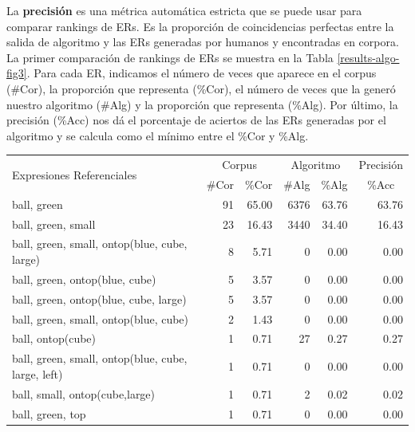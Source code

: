 La \textbf{precisi\'on}  es una m\'etrica autom\'atica estricta que se puede usar para comparar rankings de ERs. Es la proporci\'on de coincidencias perfectas entre la salida de algoritmo y las ERs generadas por humanos y encontradas en corpora. 
La primer comparaci\'on de rankings de ERs se muestra en la Tabla \ref{results-algo-fig3}. Para cada ER, indicamos el n\'umero de veces que aparece en el corpus (\#Cor), la proporci\'on que representa (\%Cor), el n\'umero de veces que la gener\'o nuestro algoritmo (\#Alg) y la proporci\'on que representa (\%Alg).
Por \'ultimo, la precisi\'on (\%Acc) nos d\'a el porcentaje de aciertos de las ERs generadas por el algoritmo y se calcula como el m\'inimo entre el \%Cor y \%Alg. 

\begin{table}[h]
\begin{small}
\begin{center}
\begin{tabular}{|l|r|r|r|r|r|}
\hline
\multirow{2}{*}{Expresiones Referenciales} & \multicolumn{2}{|c|}{Corpus} & \multicolumn{2}{|c|}{Algoritmo} & Precisi\'on \\ \cline{2-6} 
 & \#Cor & \multicolumn{1}{|c|}{\%Cor} & \multicolumn{1}{|c|}{\#Alg} & \multicolumn{1}{|c|}{\%Alg} & \multicolumn{1}{|c|}{\%Acc} \\
\hline
ball, green                                    & 91 & 65.00 & 6376 & 63.76 & 63.76 \\
ball, green, small                              & 23 & 16.43 & 3440 & 34.40 & 16.43 \\
ball, green, small, ontop(blue, cube, large)      &  8 &  5.71 &    0 &  0.00 &  0.00\\
ball, green, ontop(blue, cube)                  &  5 &  3.57 &    0 &  0.00 &  0.00\\
ball, green, ontop(blue, cube, large)            &  5 &  3.57 &    0 &  0.00 &  0.00\\
ball, green, small, ontop(blue, cube)            &  2 &  1.43 &    0 &  0.00 &  0.00\\
ball, ontop(cube)                             &  1 &  0.71 &   27 &  0.27 &  0.27 \\
ball, green, small, ontop(blue, cube, large, left) &  1 &  0.71 &    0 &  0.00 &  0.00\\
ball, small, ontop(cube,large)	              &  1 &  0.71 &    2 &  0.02 &  0.02 \\
ball, green, top                                &  1 &  0.71 &    0 &  0.00 &  0.00\\

\end{tabular}
\end{center}
\end{small}
\end{table}
